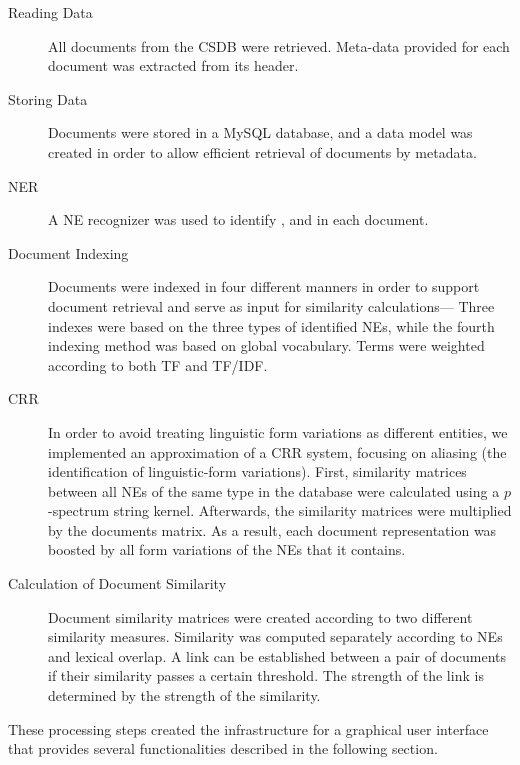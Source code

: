 \begin{description}
\item[Reading Data] All documents from the CSDB were retrieved. Meta-data provided for each document was extracted from its header.
\item[Storing Data] Documents were stored in a MySQL database, and a data model was created in order to allow efficient retrieval of documents by metadata.
\item[NER] A NE recognizer was used to identify ,  and  in each document.
\item[Document Indexing] Documents were indexed in four different manners in order to support document retrieval and serve as input for similarity calculations--- Three indexes were based on the three types of identified NEs, while the fourth indexing method was based on global vocabulary. Terms were weighted according to both TF and TF/IDF.
\item[CRR] In order to avoid treating linguistic form variations as different entities, we implemented an approximation of a CRR system, focusing on aliasing (the identification of linguistic-form variations).
First, similarity matrices between all NEs of the same type in the database were calculated using a $p$-spectrum string kernel.
Afterwards, the similarity matrices were multiplied by the documents matrix. As a result, each document representation was boosted by all form 
variations of the NEs that it contains.
\item[Calculation of Document Similarity] Document similarity matrices were created according to two different similarity measures. 
Similarity was computed separately according to NEs and lexical overlap. 
A link can be established between a pair of documents if their similarity passes a certain threshold. 
The strength of the link is determined by the strength of the similarity.
\end{description}

These processing steps created the infrastructure for a graphical user interface that provides several
functionalities described in the following section.

